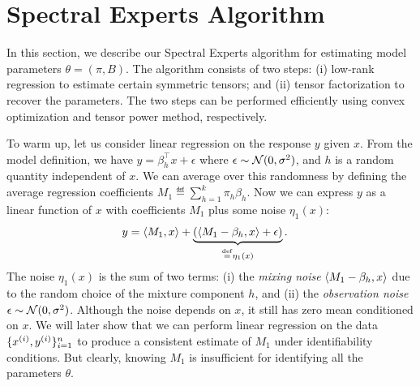 \section{Spectral Experts Algorithm}
\label{sec:algo}

In this section, we describe our Spectral Experts algorithm
for estimating model parameters $\theta = (\pi, B)$.
The algorithm consists of two steps:
(i) low-rank regression to estimate certain symmetric tensors;
and (ii) tensor factorization to recover the parameters.
The two steps can be performed efficiently using
convex optimization and tensor power method, respectively.

To warm up, let us consider linear regression
on the response $y$ given $x$.
From the model definition, we have $y = \beta_h^\top x + \epsilon$ where
$\epsilon \sim \mathcal{N}(0, \sigma^2)$, and $h$ is a random quantity
independent of $x$.
We can average over this randomness by defining
the average regression coefficients
$M_1 \eqdef \sum_{h=1}^k \pi_h \beta_h$.
Now we can express $y$ as a linear function of $x$ with coefficients $M_1$
plus some noise $\eta_1(x)$:
\begin{align}
  y &= \langle M_1, x \rangle +
  \underbrace{(\langle M_1 - \beta_h, x \rangle + \epsilon)}_{\stackrel{\rm def}{=} \eta_1(x)}. \label{eqn:y1}
\end{align}
The noise $\eta_1(x)$ is the sum of two terms:
(i) the \emph{mixing noise} $\langle M_1 - \beta_h, x \rangle$
due to the random choice of the mixture component $h$,
and (ii) the \emph{observation noise} $\epsilon \sim \mathcal{N}(0, \sigma^2)$.
Although the noise depends on $x$,
it still has zero mean conditioned on $x$.
We will later show that we can
perform linear regression on the data $\{x^{(i)},
y^{(i)}\}_{i=1}^{n}$ to produce a consistent estimate of $M_1$
under identifiability conditions.
But clearly, knowing $M_1$ is insufficient
for identifying all the parameters $\theta$.

